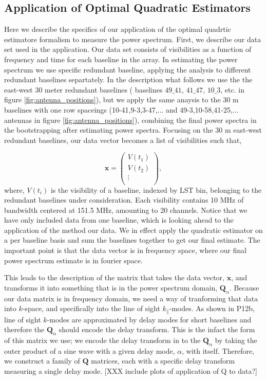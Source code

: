 \documentclass[twocolumn,numberedappendix]{emulateapj} \shorttitle{PSA64}
\begin{document}
\subsection{Application of Optimal Quadratic Estimators}
\label{sec:oqe_app}

Here we describe the specifics of our application of the optimal quadrtic
estimatore formalism to measure the power spectrum. First, we describe our data
set used in the application. Our data set consists of visibilities as a function
of frequency and time for each baseline in the array. In estimating the power
spectrum we use specific redundant baseline, applying the analysis to
different redundant baselines separtately. In the description what follows we
use the the east-west 30 meter redundant baselines ( baselines $49\_41$,
$41\_47$, $10\_3$, etc. in figure \ref{fig:antenna_positions}), but we apply the
same anaysis to the 30 m baselines with one row spaceings (10-41,9-3,3-47,...
and 49-3,10-58,41-25,... antennas in figure \ref{fig:antenna_positions}), combining
the final power spectra in the bootstrapping after estimating power spectra.
Focusing on the 30 m east-west redundant baselines, our data vector becomes a
list of visibilities such that, 

\begin{equation}
\label{eqn:xvectdef}
\mathbf{x} = \left( \begin{array}{c}
V (t_{1}) \\
V (t_{2}) \\
\vdots \\
\end{array}
\right), 
\end{equation}
where, $V(t_{i})$ is the visibility of a baseline, indexed by LST bin,
belonging to the redundant baselines under consideration. Each visibility
contains 10 MHz of bandwidth centered at 151.5 MHz, amounting to 20 channels. 
Notice that we have only included data from one baseline, which is looking ahead
to the application of the method our data. We in effect apply the quadratic
estimator on a per baseline basis and sum the baselines together to get our
final estimate. The important point is that the data vector is in frequency
space, where our final power spectrum estimate is in fourier space. 

This leads to the description of the matrix that takes the data vector,
$\mathbf{x}$, and transforms it into something that is in the power spectrum
domain, $\mathbf{Q}_{\alpha}$. Because our data matrix is in frequency domain,
we need a way of tranforming that data into $k$-space, and specifically into
the line of sight $k_{\parallel}$-modes. As shown in P12b,
line of sight $k$-modes are approximated by delay modes for short baselines and
therefore the $\mathbf{Q}_{\alpha}$ should encode the delay transform. This is
the infact the form of this matrix we use; we encode the delay transform in to
the $\mathbf{Q}_{\alpha}$ by taking the outer product of a sine wave with a
given delay mode, $\alpha$,  with itself.  Therefore, we construct a family of
$\mathbf{Q}$ matrices, each with a specific delay transform measuring a single
delay mode. [XXX include plots of application of Q to data?]
\end{document}
